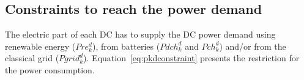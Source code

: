 



\subsection{Constraints to reach the power demand}




The electric part of each DC has to supply the DC power demand using renewable energy ($Pre_k^d$), from batteries ($Pdch_k^d$ and $Pch_k^d$) and/or from the classical grid ($Pgrid_k^d$). Equation~\eqref{eq:pkdconstraint} presents the restriction for the power consumption.



